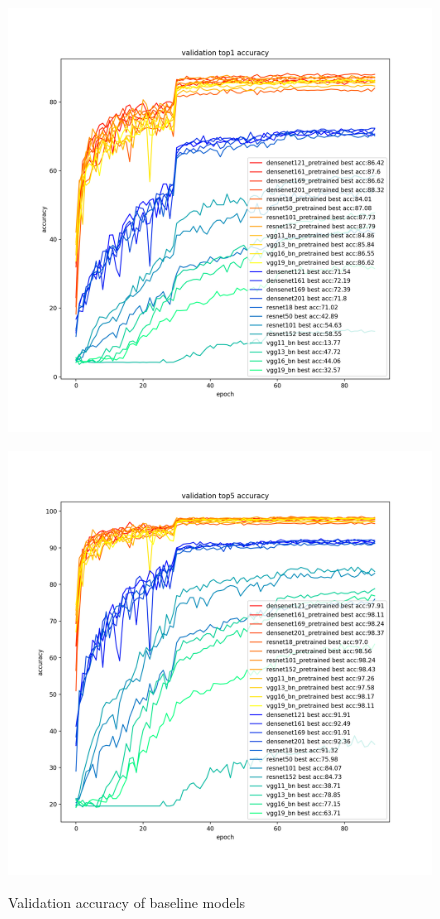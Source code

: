 \begin{figure}[H]
  \begin{minipage}[t]{0.5\linewidth}
    \centering
    \includegraphics[width=1.1\textwidth]{figs/val_acc1.png}
    \label{fig:val_acc1}
  \end{minipage}\hfill
  \begin{minipage}[t]{0.5\linewidth}
    \centering
    \includegraphics[width=1.1\textwidth]{figs/val_acc5.png}
    \label{fig:val_acc5}
  \end{minipage}
  \caption{Validation accuracy of baseline models}
\end{figure}


